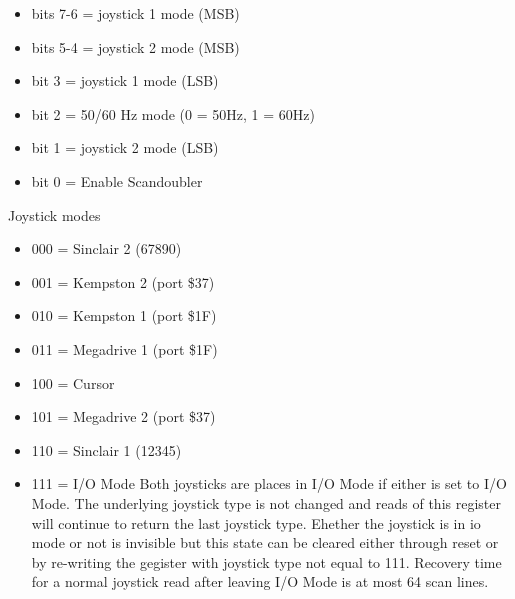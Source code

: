 \begin{itemize}
\item bits 7-6 = joystick 1 mode (MSB)
\item bits 5-4 = joystick 2 mode (MSB)
\item bit 3 = joystick 1 mode (LSB)
\item bit 2 = 50/60 Hz mode (0 = 50Hz, 1 = 60Hz)
\item bit 1 = joystick 2 mode (LSB)
\item bit 0 = Enable Scandoubler
\end{itemize}
Joystick modes
\begin{itemize}
\item 000 = Sinclair 2 (67890)
\item 001 = Kempston 2 (port \$37)
\item 010 = Kempston 1 (port \$1F)
\item 011 = Megadrive 1 (port \$1F)
\item 100 = Cursor
\item 101 = Megadrive 2 (port \$37)
\item 110 = Sinclair 1 (12345)
\item 111 = I/O Mode
Both joysticks are places in I/O Mode if either is set to I/O
Mode. The underlying joystick type is not changed and reads of this
register will continue to return the last joystick type. Ehether the
joystick is in io mode or not is invisible but this state can be
cleared either through reset or by re-writing the gegister with
joystick type not equal to 111. Recovery time for a normal joystick
read after leaving I/O Mode is at most 64 scan lines.
\end{itemize}

